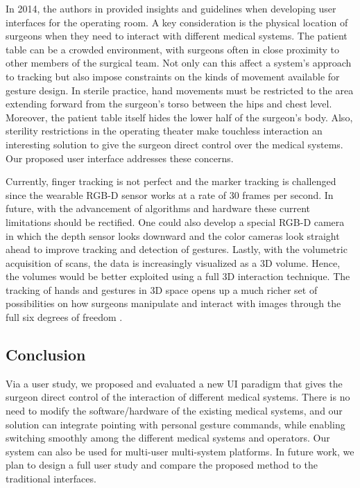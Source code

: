 In 2014, the authors in \cite{Pederson2010} provided insights and guidelines when developing user interfaces for the operating room. A key consideration is the physical location of surgeons when they need to interact with different medical systems. The patient table can be a crowded environment, with surgeons often in close proximity to other members of the surgical team. Not only can this affect a system’s approach to tracking but also impose constraints on the kinds of movement available for gesture design. In sterile practice, hand movements must be restricted to the area extending forward from the surgeon's torso between the hips and chest level. Moreover, the patient table itself hides the lower half of the surgeon's body. Also, sterility restrictions in the operating theater make touchless interaction an interesting solution to give the surgeon direct control over the medical systems. Our proposed user interface addresses these concerns.

Currently, finger tracking is not perfect and the marker tracking is challenged since the wearable RGB-D sensor works at a rate of 30 frames per second. In future, with the advancement of algorithms and hardware these current limitations should be rectified.
One could also develop a special RGB-D camera in which the depth sensor looks downward and the color cameras look straight ahead to improve tracking and detection of gestures. Lastly, with the volumetric acquisition of scans, the data is increasingly visualized as a 3D volume. Hence, the volumes would be better exploited using a full 3D interaction technique. The tracking of hands and gestures in 3D space opens up a much richer set of possibilities on how surgeons manipulate and interact with images through the full six degrees of freedom \cite{Pederson2010}.

\subsection{Conclusion}
Via a user study, we proposed and evaluated a new UI paradigm that gives the surgeon direct control of the interaction of different medical systems. There is no need to modify the software/hardware of the existing medical systems, and our solution can integrate pointing with personal gesture commands, while enabling switching smoothly among the different medical systems and operators. Our system can also be used for multi-user multi-system platforms. In future work, we plan to design a full user study and compare the proposed method to the traditional interfaces.